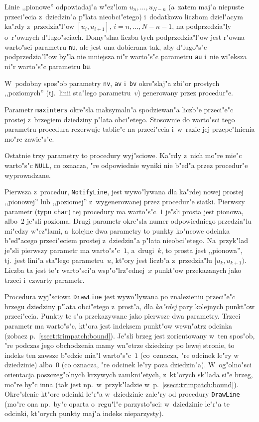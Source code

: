 Linie ,,pionowe'' odpowiadaj"a w"ez"lom $u_n,\ldots,u_{N-n}$
(a~zatem maj"a niepuste przeci"ecia z~dziedzin"a p"lata nieobci"etego)
i~dodatkowo liczbom dziel"acym ka"rdy z~przedzia"l"ow $[u_i,u_{i+1}]$,
$i=n,\ldots,N-n-1$, na podprzedzia"ly o~r"ownych d"lugo"sciach.
Domy"slna liczba tych podprzedzia"l"ow jest r"owna warto"sci parametru
\texttt{nu}, ale jest ona dobierana tak, aby d"lugo"s"c podprzedzia"l"ow
by"la nie mniejsza ni"r warto"s"c parametru \texttt{au} i~nie wi"eksza ni"r
warto"s"c parametru \texttt{bu}.

W~podobny spos"ob parametry \texttt{nv}, \texttt{av} i~\texttt{bv}
okre"slaj"a zbi"or prostych ,,poziomych'' (tj.\ linii sta"lego
parametru~$v$) generowany przez procedur"e.

Parametr \texttt{maxinters} okre"sla maksymaln"a spodziewan"a liczb"e
przeci"e"c prostej z~brzegiem dziedziny p"lata obci"etego. Stosownie do
warto"sci tego parametru procedura rezerwuje tablic"e na przeci"ecia
i~w~razie jej przepe"lnienia mo"re zawie"s"c.

Ostatnie trzy parametry to procedury wyj"sciowe. Ka"rdy z~nich mo"re mie"c
warto"s"c \texttt{NULL}, co oznacza, "re odpowiednie wyniki nie b"ed"a przez
procedur"e wyprowadzane.

Pierwsza z~procedur, \texttt{NotifyLine}, jest wywo"lywana dla ka"rdej nowej
prostej ,,pionowej'' lub ,,poziomej'' z~wygenerowanej przez procedur"e
siatki. Pierwszy parametr (typu \texttt{char}) tej procedury ma
warto"s"c~$1$ je"sli prosta jest pionowa, albo~$2$ je"sli pozioma.
Drugi parametr okre"sla numer odpowiedniego przedzia"lu mi"edzy w"ez\-"la\-mi,
a~kolejne dwa parametry to punkty ko"ncowe odcinka b"ed"acego przeci"eciem
prostej z~dziedzin"a p"lata nieobci"etego. Na~przyk"lad je"sli pierwszy
parametr ma warto"s"c~$1$, a~drugi~$k$, to prosta jest ,,pionowa'', tj.\
jest lini"a sta"lego parametru~$u$, kt"ory jest liczb"a z~przedzia"lu
$[u_k,u_{k+1})$. Liczba ta jest te"r warto"sci"a wsp"o"lrz"ednej~$x$
punkt"ow przekazanych jako trzeci i~czwarty parametr.

Procedura wyj"sciowa \texttt{DrawLine} jest wywo"lywana po znalezieniu
przeci"e"c brzegu dziedziny p"lata obci"etego z~prost"a, dla \emph{ka"rdej}
pary kolejnych punkt"ow przeci"ecia. Punkty te s"a przekazywane jako
pierwsze dwa parametry. Trzeci parametr ma warto"s"c, kt"ora jest indeksem
punkt"ow wewn"atrz odcinka (zobacz p.~\ref{ssect:trimpatch:bound}). Je"sli
brzeg jest zorientowany w~ten spos"ob, "re podczas jego obchodzenia mamy
wn"etrze dziedziny po lewej stronie, to indeks ten zawsze b"edzie mia"l
warto"s"c~$1$ (co~oznacza, "re odcinek le"ry w dziedzinie) albo~$0$ (co
oznacza, "re odcinek le"ry poza dziedzin"a). W~og"olno"sci orientacja
poszczeg"olnych krzywych zamkni"etych, z~kt"orych sk"lada si"e brzeg, mo"re
by"c inna (tak jest np.\ w~przyk"ladzie w~p.~\ref{ssect:trimpatch:bound}).
Okre"slenie kt"ore odcinki le"r"a w~dziedzinie zale"ry od procedury
\texttt{DrawLine} (mo"re ona np.\ by"c oparta o~regu"l"e parzysto"sci:
w~dziedzinie le"r"a te odcinki, kt"orych punkty maj"a indeks nieparzysty).

